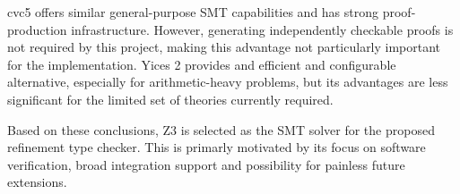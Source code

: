 cvc5 offers similar general-purpose SMT capabilities and has strong proof-production infrastructure.
However, generating independently checkable proofs is not required by this project, making this advantage
not particularly important for the implementation. Yices 2 provides and efficient and configurable alternative,
especially for arithmetic-heavy problems, but its advantages are less significant for the limited set of theories
currently required.

Based on these conclusions, Z3 is selected as the SMT solver for the proposed refinement type checker.
This is primarly motivated by its focus on software verification, broad integration support and possibility
for painless future extensions.






